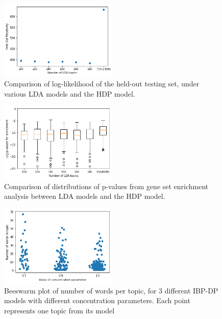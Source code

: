 \documentclass{article}
\begin{document}
\begin{figure}
    \centering
    \includegraphics[width=0.5\textwidth]{figs/hdp-perplexity}
    \caption{Comparison of log-likelihood of the held-out testing set, under various LDA models and the HDP model.}
    \label{fig:hdp-perplexity}
\end{figure}

\begin{figure}
    \centering
    \includegraphics[width=0.5\textwidth]{figs/hdp-enrichment}
    \caption{Comparison of distributions of p-values from gene set enrichment analysis between LDA models and the HDP model.}
    \label{fig:hdp-enrichment}
\end{figure}

\begin{figure}
    \centering
    \includegraphics[width=0.5\textwidth]{figs/ibp_words_in_topic}
    \caption{Beeswarm plot of number of words per topic, for 3 different IBP-DP models with different concentration parameters. Each point represents one topic from its model}
    \label{fig:ibp_words_in_topic}
\end{figure}
\end{document}
